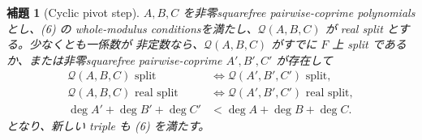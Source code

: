 \documentclass[uplatex,dvipdfmx]{jsarticle}
\newtheorem{lemma}[theorem]{補題}
\theoremstyle{definition}
\theoremstyle{remark}
\begin{document}
\begin{lemma}[Cyclic pivot step]\label{lem:pivot-ja}
$A,B,C$ を非零squarefree pairwise-coprime polynomials とし、(6) の whole-modulus
conditionsを満たし、$\mathcal Q(A,B,C)$ が real split とする。少なくとも一係数が
非定数なら、$\mathcal Q(A,B,C)$ がすでに $F$ 上 split であるか、または非零squarefree
pairwise-coprime $A',B',C'$ が存在して
\[
\begin{split}
 \mathcal Q(A,B,C)\text{ split}
   &\Longleftrightarrow\mathcal Q(A',B',C')\text{ split},\\
 \mathcal Q(A,B,C)\text{ real split}
   &\Longleftrightarrow\mathcal Q(A',B',C')\text{ real split},\\
 \deg A'+\deg B'+\deg C'
   &<\deg A+\deg B+\deg C.
\end{split}                                             \tag{7}
\]
となり、新しい triple も (6) を満たす。
\end{lemma}
\end{document}
